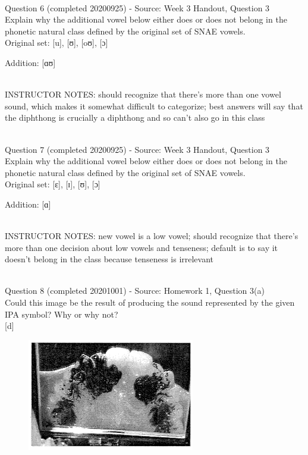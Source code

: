 \documentclass[12pt]{article}
\begin{document}
~\\

{\large Question 6} (completed 20200925) - Source: Week 3 Handout, Question 3\\

Explain why the additional vowel below either does or does not belong in the phonetic natural class defined by the original set of SNAE vowels.\\

Original set: {[u]}, {[ʊ]}, {[oʊ]}, {[ɔ]}

Addition: {[ɑʊ]}


~\\
INSTRUCTOR NOTES: should recognize that there's more than one vowel sound, which makes it somewhat difficult to categorize; best answers will say that the diphthong is crucially a diphthong and so can't also go in this class


~\\

{\large Question 7} (completed 20200925) - Source: Week 3 Handout, Question 3\\

Explain why the additional vowel below either does or does not belong in the phonetic natural class defined by the original set of SNAE vowels.\\

Original set: {[ɛ]}, {[ɪ]}, {[ʊ]}, {[ɔ]}

Addition: {[ɑ]}


~\\
INSTRUCTOR NOTES: new vowel is a low vowel; should recognize that there's more than one decision about low vowels and tenseness; default is to say it doesn't belong in the class because tenseness is irrelevant


~\\

{\large Question 8} (completed 20201001) - Source: Homework 1, Question 3(a)\\

Could this image be the result of producing the sound represented by the given IPA symbol? Why or why not?\\

{[d]}

\begin{figure}[H]
\includegraphics{../images/staticpalatography_fricative.png}
\end{figure}
\end{document}
